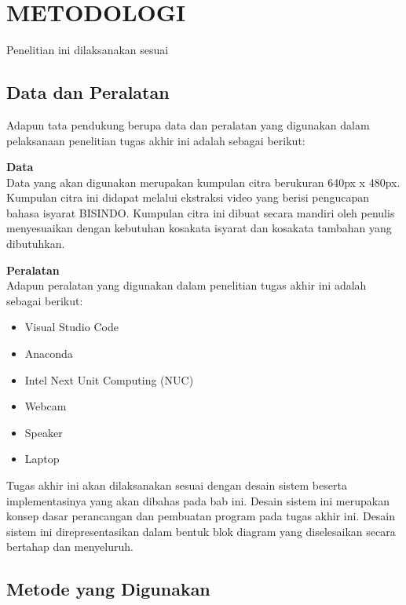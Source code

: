 \chapter{METODOLOGI}
\label{chap:metodologi}


Penelitian ini dilaksanakan sesuai \lipsum[1][1-5]
\section{Data dan Peralatan}
Adapun tata pendukung berupa data dan peralatan yang digunakan dalam pelaksanaan penelitian tugas akhir ini adalah sebagai berikut:

\noindent \textbf{Data}\\
Data yang akan digunakan merupakan kumpulan citra berukuran 640px x 480px. Kumpulan citra ini didapat melalui ekstraksi video yang berisi pengucapan bahasa isyarat BISINDO. Kumpulan citra ini dibuat secara mandiri oleh penulis menyesuaikan dengan kebutuhan kosakata isyarat dan kosakata tambahan yang dibutuhkan.

\noindent \textbf{Peralatan}\\
Adapun peralatan yang digunakan dalam penelitian tugas akhir ini adalah sebagai berikut:

\begin{itemize}
  \item Visual Studio Code
  \item Anaconda
  \item Intel Next Unit Computing (NUC) 
  \item Webcam
  \item Speaker
  \item Laptop
\end{itemize}

Tugas akhir ini akan dilaksanakan sesuai dengan desain sistem beserta implementasinya yang akan dibahas pada bab ini. Desain sistem ini merupakan konsep dasar perancangan dan pembuatan program pada tugas akhir ini. Desain sistem ini direpresentasikan dalam bentuk blok diagram yang diselesaikan secara bertahap dan menyeluruh.

\section{Metode yang Digunakan}



